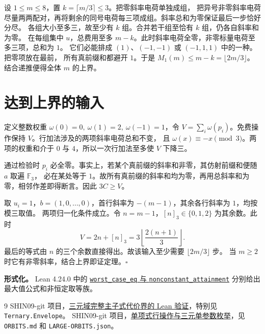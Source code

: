 \documentclass[UTF8,scheme=plain,a4paper,11pt]{ctexart}
\newcommand{\F}{\mathbb F_3}
\newcommand{\cost}{\lfloor 2m/3\rfloor}
\begin{document}
设 $1\le m\le8$，置 $k=\lceil m/3\rceil\le3$。把零斜率电荷单独成组，
把异号非零斜率电荷尽量两两配对，再将剩余的同号电荷每三项成组。斜率总和为零保证最后一步恰好分尽。
各组大小至多三，故至少有 $k$ 组。合并若干组至恰有 $k$ 组，仍各自斜率和为零。
在每组集中 $u$，总费用至多 $m-k$。此时斜率电荷全零，非零标量电荷至多三项，总和为 $1$。
它们必能排成 $(1)$、$(-1,-1)$ 或 $(-1,1,1)$ 中的一种。把零项放在最前，
所有真前缀和都避开 $1$。于是 $M_1(m)\le m-k=\cost$。结合递推便得全体 $m$ 的上界。

\section{达到上界的输入}
定义整数权重 $\omega(0)=0,\ \omega(1)=2,\ \omega(-1)=1$，令
$V=\sum_i\omega(p_i)$。免费操作保持 $V$。行加法涉及的两项斜率电荷总和不变，
且 $\omega(x)\equiv -x\pmod3$。两项的权重和介于 $0$ 与 $4$，所以一次行加法至多使 $V$ 下降三。

通过检验时 $p_i$ 必全零。事实上，若某个真前缀的斜率和非零，其仿射前缀和便随 $a$ 取遍 $\F$，
必在某处等于 $1$。故所有真前缀的斜率和均为零，再用总斜率和为零，相邻作差即得断言。因此 $3C\ge V$。

取 $u_i=1$，$b=(1,0,\ldots,0)$，首行斜率为 $-(m-1)$，其余各行斜率为 $1$，均按模三取值。
两项归一化条件成立。令 $n=m-1$，$[n]_3\in\{0,1,2\}$ 为其余数。此时
\[
       V=2n+[n]_3=3\left\lfloor\frac{2(n+1)}3\right\rfloor .
\]
最后的等式由 $n$ 的三个余数直接得出。故该输入至少需要 $\cost$ 步。
当 $m\ge2$ 时它有非零斜率，结合上界即证定理。\hfill$\square$

\smallskip\noindent\textbf{形式化。}
Lean 4.24.0 中的 \href{https://github.com/SHIN09-git/integer-mult-bounds/blob/codex/ternary-guard-affine-quotient/research/monomial-guard-affine-quotient/AffineGuard/OneParameter/WorstCase.lean}{\texttt{worst\_case\_eq} 与 \texttt{nonconstant\_attainment}}
分别给出最大值公式和非恒定取等族。

\begin{thebibliography}{9}\small
{} SHIN09-git 项目，\href{https://github.com/SHIN09-git/integer-mult-bounds/tree/5703e56d6eb4b4f0a83af8c23a5d1dddd0b5474f/research/monomial-guard-ternary-lean}{三元域完整主子式代价界的 Lean 验证}，特别见 \texttt{Ternary.Envelope}。
 SHIN09-git 项目，\href{https://github.com/SHIN09-git/integer-mult-bounds/tree/b6509f720197a2a760b8c06125e5bfc56bc736dd/research/monomial-guard-settlement}{单项式行操作与三元单参数枚举}，见 \texttt{ORBITS.md} 和 \texttt{LARGE-ORBITS.json}。
\end{thebibliography}
\end{document}
